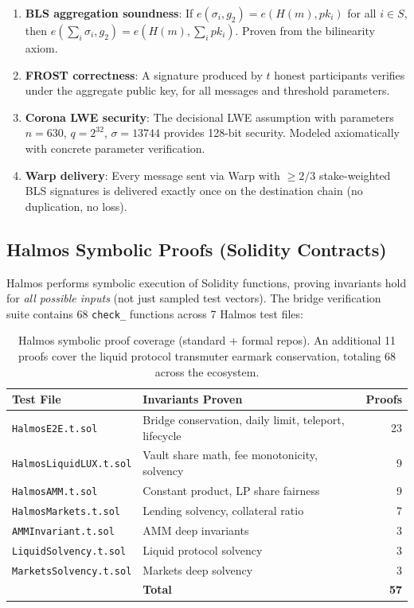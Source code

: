 \begin{enumerate}[leftmargin=1.1em]
  \item \textbf{BLS aggregation soundness}: If $e(\sigma_i, g_2) = e(H(m), pk_i)$ for all $i \in S$, then $e(\sum_i \sigma_i, g_2) = e(H(m), \sum_i pk_i)$. Proven from the bilinearity axiom.
  \item \textbf{FROST correctness}: A signature produced by $t$ honest participants verifies under the aggregate public key, for all messages and threshold parameters.
  \item \textbf{Corona LWE security}: The decisional LWE assumption with parameters $n = 630$, $q = 2^{32}$, $\sigma = 13744$ provides 128-bit security. Modeled axiomatically with concrete parameter verification.
  \item \textbf{Warp delivery}: Every message sent via Warp with $\geq 2/3$ stake-weighted BLS signatures is delivered exactly once on the destination chain (no duplication, no loss).
\end{enumerate}

\subsection{Halmos Symbolic Proofs (Solidity Contracts)}

Halmos \cite{halmos} performs symbolic execution of Solidity functions, proving invariants hold for \emph{all possible inputs} (not just sampled test vectors). The bridge verification suite contains 68 \texttt{check\_} functions across 7 Halmos test files:

\begin{table}[h]
\centering
\begin{tabular}{llr}
\toprule
\textbf{Test File} & \textbf{Invariants Proven} & \textbf{Proofs} \\
\midrule
\texttt{HalmosE2E.t.sol} & Bridge conservation, daily limit, teleport, lifecycle & 23 \\
\texttt{HalmosLiquidLUX.t.sol} & Vault share math, fee monotonicity, solvency & 9 \\
\texttt{HalmosAMM.t.sol} & Constant product, LP share fairness & 9 \\
\texttt{HalmosMarkets.t.sol} & Lending solvency, collateral ratio & 7 \\
\texttt{AMMInvariant.t.sol} & AMM deep invariants & 3 \\
\texttt{LiquidSolvency.t.sol} & Liquid protocol solvency & 3 \\
\texttt{MarketsSolvency.t.sol} & Markets deep solvency & 3 \\
\midrule
& \textbf{Total} & \textbf{57} \\
\bottomrule
\end{tabular}
\caption{Halmos symbolic proof coverage (standard + formal repos). An additional 11 proofs cover the liquid protocol transmuter earmark conservation, totaling 68 across the ecosystem.}
\end{table}

